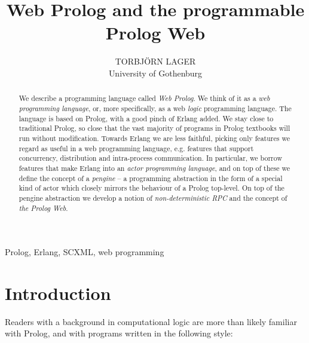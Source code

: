 \documentclass{tlp}
\begin{document}


\title{Web Prolog and the programmable Prolog Web}


\author[T. Lager]
{TORBJ\"ORN LAGER \\
University of Gothenburg\\
}

\pagerange{\pageref{firstpage}--\pageref{lastpage}}
\setcounter{page}{1}

\maketitle
\begin{abstract}
We describe a programming language called \textit{Web Prolog}. We think of it as a \textit{web programming language}, or, more specifically, as a web \emph{logic} programming language. The language is based on Prolog, with a good pinch of Erlang added. We stay close to traditional Prolog, so close that the vast majority of programs in Prolog textbooks will run without modification. Towards Erlang we are less faithful, picking only features we regard as useful in a web programming language, e.g. features that support concurrency, distribution and intra-process communication. In particular, we borrow features that make Erlang into an \textit{actor programming language}, and on top of these we define the concept of a \textit{pengine} -- a programming abstraction in the form of a special kind of actor which closely mirrors the behaviour of a Prolog top-level. On top of the pengine abstraction we develop a notion of \textit{non-deterministic RPC} and the concept of \textit{the Prolog Web}.
\end{abstract}


\begin{keywords}
Prolog, Erlang, SCXML, web programming
\end{keywords}


\section{Introduction}\label{s1}

\noindent Readers with a background in computational logic are more than likely familiar with Prolog, and with programs written in the following style:
\end{document}
